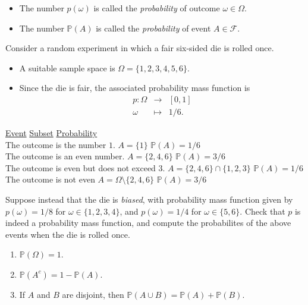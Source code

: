 \documentclass[lecture]{csm}
\newcommand{\prob}{\mathbb{P}}
\def\it{\item}
\def\bit{\begin{itemize}}
\def\eit{\end{itemize}}
\def\ben{\begin{enumerate}}
\def\een{\end{enumerate}}
\begin{document}
\begin{remark}
\bit
\it The number $p(\omega)$ is called the \emph{probability} of outcome $\omega\in\Omega$.
\it The number $\prob(A)$ is called the \emph{probability} of event $A\in\mathcal{F}$.
\eit
\end{remark}



\break %

\begin{example}
Consider a random experiment in which a fair six-sided die is rolled once.
\bit
\it A suitable sample space is $\Omega=\{1,2,3,4,5,6\}$.
\it Since the die is fair, the associated probability mass function is
\[\begin{array}{rcl}
p:	\Omega & \to & [0,1] \\
	\omega & \mapsto & 1/6.
\end{array}\] 
\eit
\begin{tabbing}
\underline{Event}\qquad\qquad\qquad\qquad\qquad\qquad\qquad\qquad\qquad
	\=\underline{Subset}\qquad\qquad\qquad\qquad\qquad
	\=\underline{Probability} \\
The outcome is the number $1$.	\> $A = \{1\}$ \> $\prob(A) = 1/6$\\
The outcome is an even number.	\> $A = \{2,4,6\}$  \> $\prob(A) = 3/6$\\
The outcome is even but does not exceed $3$.	\> $A = \{2,4,6\}\cap\{1,2,3\}$  \> $\prob(A) = 1/6$\\
The outcome is not even			\> $A = \Omega\setminus\{2,4,6\}$ \> $\prob(A) = 3/6$
\end{tabbing}
\end{example}

\begin{exercise}
Suppose instead that the die is \emph{biased}, with probability mass function given by $p(\omega)=1/8$ for $\omega\in\{1,2,3,4\}$, and $p(\omega)=1/4$ for $\omega\in\{5,6\}$. Check that $p$ is indeed a probability mass function, and compute the probabilites of the above events when the die is rolled once.
\end{exercise}


\break %
\begin{theorem}
\ben
\it $\prob(\Omega)=1$.
\it $\prob(A^c) = 1 - \prob(A)$.
\it If $A$ and $B$ are disjoint, then $\prob(A\cup B) = \prob(A)+\prob(B)$.
\een
\end{theorem}
\end{document}
